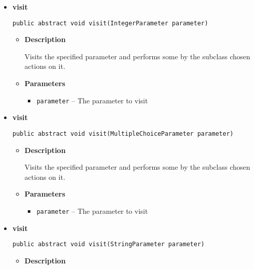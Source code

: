 {{{{{{{{{{{\begin{itemize}
{\begin{itemize}
{Visits the specified parameter and performs some by the subclass chosen actions on it.
}
\item{
{\bf  Parameters}
  \begin{itemize}
   \item{
\texttt{parameter} -- The parameter to visit}
  \end{itemize}
}%
\end{itemize}
}%
\item{ 
{\bf  visit}\\
\begin{lstlisting}[frame=none]
public abstract void visit(IntegerParameter parameter)\end{lstlisting} %
\begin{itemize}
\item{
{\bf  Description}

Visits the specified parameter and performs some by the subclass chosen actions on it.
}
\item{
{\bf  Parameters}
  \begin{itemize}
   \item{
\texttt{parameter} -- The parameter to visit}
  \end{itemize}
}%
\end{itemize}
}%
\item{ 
{\bf  visit}\\
\begin{lstlisting}[frame=none]
public abstract void visit(MultipleChoiceParameter parameter)\end{lstlisting} %
\begin{itemize}
\item{
{\bf  Description}

Visits the specified parameter and performs some by the subclass chosen actions on it.
}
\item{
{\bf  Parameters}
  \begin{itemize}
   \item{
\texttt{parameter} -- The parameter to visit}
  \end{itemize}
}%
\end{itemize}
}%
\item{ 
{\bf  visit}\\
\begin{lstlisting}[frame=none]
public abstract void visit(StringParameter parameter)\end{lstlisting} %
\begin{itemize}
\item{
{\bf  Description}

}
\end{itemize}}
\end{itemize}}}}}}}}}}}}

